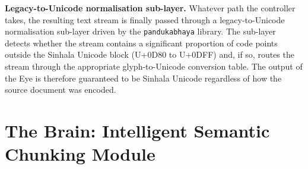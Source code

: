 \documentclass[12pt,a4paper,oneside]{report}
\begin{document}
\textbf{Legacy-to-Unicode normalisation sub-layer.}
\label{sec:approach-norm}
Whatever path the controller takes, the resulting text stream is finally passed through a legacy-to-Unicode normalisation sub-layer driven by the \texttt{pandukabhaya} library. The sub-layer detects whether the stream contains a significant proportion of code points outside the Sinhala Unicode block (U+0D80 to U+0DFF) and, if so, routes the stream through the appropriate glyph-to-Unicode conversion table. The output of the Eye is therefore guaranteed to be Sinhala Unicode regardless of how the source document was encoded.

\section{The Brain: Intelligent Semantic Chunking Module}
\label{sec:approach-brain}
\end{document}

